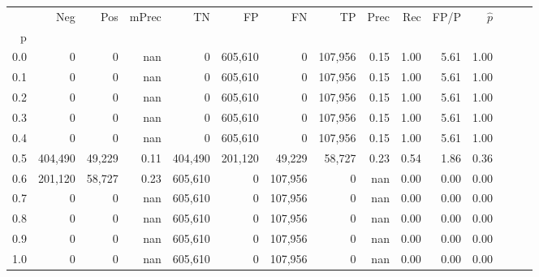 \begin{tabular}{rrrrrrrrrrrrrrr}
\toprule
{} &      Neg &     Pos & mPrec &       TN &       FP &       FN &       TP &  Prec &   Rec &  FP/P & $\hat{p}$ \\
p   &          &         &       &          &          &          &          &       &       &       &           \\
\midrule
0.0 &        0 &       0 &   nan &        0 &  605,610 &        0 &  107,956 &  0.15 &  1.00 &  5.61 &      1.00 \\
0.1 &        0 &       0 &   nan &        0 &  605,610 &        0 &  107,956 &  0.15 &  1.00 &  5.61 &      1.00 \\
0.2 &        0 &       0 &   nan &        0 &  605,610 &        0 &  107,956 &  0.15 &  1.00 &  5.61 &      1.00 \\
0.3 &        0 &       0 &   nan &        0 &  605,610 &        0 &  107,956 &  0.15 &  1.00 &  5.61 &      1.00 \\
0.4 &        0 &       0 &   nan &        0 &  605,610 &        0 &  107,956 &  0.15 &  1.00 &  5.61 &      1.00 \\
0.5 &  404,490 &  49,229 &  0.11 &  404,490 &  201,120 &   49,229 &   58,727 &  0.23 &  0.54 &  1.86 &      0.36 \\
0.6 &  201,120 &  58,727 &  0.23 &  605,610 &        0 &  107,956 &        0 &   nan &  0.00 &  0.00 &      0.00 \\
0.7 &        0 &       0 &   nan &  605,610 &        0 &  107,956 &        0 &   nan &  0.00 &  0.00 &      0.00 \\
0.8 &        0 &       0 &   nan &  605,610 &        0 &  107,956 &        0 &   nan &  0.00 &  0.00 &      0.00 \\
0.9 &        0 &       0 &   nan &  605,610 &        0 &  107,956 &        0 &   nan &  0.00 &  0.00 &      0.00 \\
1.0 &        0 &       0 &   nan &  605,610 &        0 &  107,956 &        0 &   nan &  0.00 &  0.00 &      0.00 \\
\bottomrule
\end{tabular}
